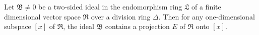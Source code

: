 Let $\mathfrak{B} \neq 0$ be a two-sided ideal in the endomorphism ring $\mathfrak{L}$ of a finite dimensional vector space $\mathfrak{R}$ over a division ring $\Delta$. Then for any one-dimensional subspace $[x]$ of $\mathfrak{R}$, the ideal $\mathfrak{B}$ contains a projection $E$ of $\mathfrak{R}$ onto $[x]$.
